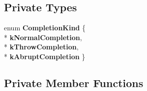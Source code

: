 \subsection*{Private Types}
\begin{DoxyCompactItemize}
\item 
enum {\bfseries Completion\+Kind} \{ \\*
{\bfseries k\+Normal\+Completion}, 
\\*
{\bfseries k\+Throw\+Completion}, 
\\*
{\bfseries k\+Abrupt\+Completion}
 \}\hypertarget{classv8_1_1internal_1_1_parser_a76ecb9426310961310524f13f00ebb84}{}\label{classv8_1_1internal_1_1_parser_a76ecb9426310961310524f13f00ebb84}

\end{DoxyCompactItemize}
\subsection*{Private Member Functions}
